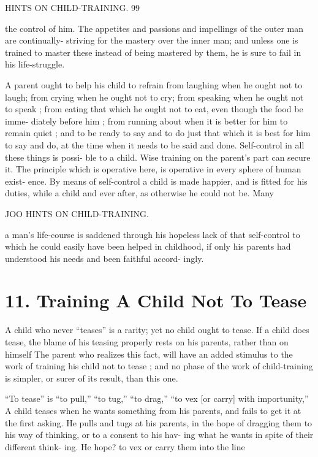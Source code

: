 \documentclass[
]{book}
\begin{document}
HINTS ON CHILD-TRAINING. 99

the control of him. The appetites and passions and impellings of the outer man are continually- striving for the mastery over the inner man; and unless one is trained to master these instead of being mastered by them, he is sure to fail in his life-struggle.

A parent ought to help his child to refrain from laughing when he ought not to laugh; from crying when he ought not to cry; from speaking when he ought not to speak ; from eating that which he ought not to eat, even though the food be imme- diately before him ; from running about when it is better for him to remain quiet ; and to be ready to say and to do just that which it is best for him to say and do, at the time when it needs to be said and done. Self-control in all these things is possi- ble to a child. Wise training on the parent's part can secure it. The principle which is operative here, is operative in every sphere of human exist- ence. By means of self-control a child is made happier, and is fitted for his duties, while a child and ever after, as otherwise he could not be. Many

JOO HINTS ON CHILD-TRAINING.

a man's life-course is saddened through his hopeless lack of that self-control to which he could easily have been helped in childhood, if only his parents had understood his needs and been faithful accord- ingly.

\hypertarget{training-a-child-not-to-tease}{%
\chapter{11. Training A Child Not To Tease}\label{training-a-child-not-to-tease}}

A child who never ``teases'' is a rarity; yet no child ought to tease. If a child does tease, the blame of his teasing properly rests on his parents, rather than on himself The parent who realizes this fact, will have an added stimulus to the work of training his child not to tease ; and no phase of the work of child-training is simpler, or surer of its result, than this one.

``To tease'' is ``to pull,'' ``to tug,'' ``to drag,'' ``to vex {[}or carry{]} with importunity,'' A child teases when he wants something from his parents, and fails to get it at the first asking. He pulls and tugs at his parents, in the hope of dragging them to his way of thinking, or to a consent to his hav- ing what he wants in spite of their different think- ing. He hope? to vex or carry them into the line
\end{document}
